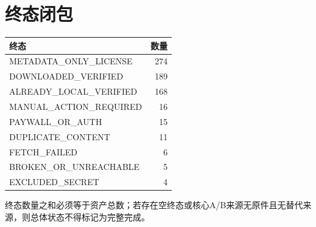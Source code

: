 \documentclass[UTF8,openany,oneside,11pt]{ctexbook}
\begin{document}
\chapter{终态闭包}
\begin{longtable}{L{9.8cm}r}\toprule
终态 & 数量\\\midrule\endhead
METADATA\_\allowbreak{}ONLY\_\allowbreak{}LICENSE & 274 \\
DOWNLOADED\_\allowbreak{}VERIFIED & 189 \\
ALREADY\_\allowbreak{}LOCAL\_\allowbreak{}VERIFIED & 168 \\
MANUAL\_\allowbreak{}ACTION\_\allowbreak{}REQUIRED & 16 \\
PAYWALL\_\allowbreak{}OR\_\allowbreak{}AUTH & 15 \\
DUPLICATE\_\allowbreak{}CONTENT & 11 \\
FETCH\_\allowbreak{}FAILED & 6 \\
BROKEN\_\allowbreak{}OR\_\allowbreak{}UNREACHABLE & 5 \\
EXCLUDED\_\allowbreak{}SECRET & 4 \\
\bottomrule\end{longtable}
终态数量之和必须等于资产总数；若存在空终态或核心A/B来源无原件且无替代来源，则总体状态不得标记为完整完成。
\end{document}

